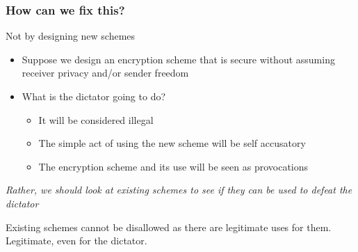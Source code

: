 \documentclass[handout]{beamer}
\begin{document}
\begin{frame}
\frametitle{How can we fix this?}

{\color{blue} Not by designing new schemes}

\pause

\begin{itemize}
\item Suppose we design an encryption scheme that is secure 
without assuming receiver privacy and/or sender freedom

\item What is the dictator going to do?

    \begin{itemize}
    \item It will be considered illegal
    \item The simple act of using the new scheme will be self accusatory
    \item The encryption scheme and its use will be seen as provocations
    \end{itemize}

\end{itemize}

\pause

\vskip 1cm
{\color{brown}\em 
Rather, we should look at {\em existing} schemes to see if they can
be used to defeat the dictator
}

\pause

\vfill
Existing schemes cannot be disallowed as there are legitimate uses for
them. Legitimate, even for the dictator.
\end{frame}
\end{document}
